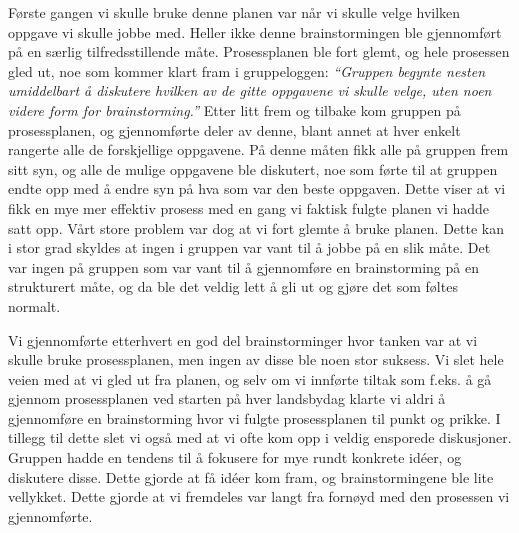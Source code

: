 Første gangen vi skulle bruke denne planen var når vi skulle velge hvilken oppgave vi skulle jobbe med. Heller ikke denne brainstormingen ble gjennomført på en særlig tilfredsstillende måte. Prosessplanen ble fort glemt, og hele prosessen gled ut, noe som kommer klart fram i gruppeloggen:
\newline
\emph{“Gruppen begynte nesten umiddelbart å diskutere hvilken av de gitte oppgavene vi skulle velge, uten noen videre form for brainstorming.”} 
\newline
Etter litt frem og tilbake kom gruppen på prosessplanen, og gjennomførte deler av denne, blant annet at hver enkelt rangerte alle de forskjellige oppgavene. På denne måten fikk alle på gruppen frem sitt syn, og alle de mulige oppgavene ble diskutert, noe som førte til at gruppen endte opp med å endre syn på hva som var den beste oppgaven. Dette viser at vi fikk en mye mer effektiv prosess med en gang vi faktisk fulgte planen vi hadde satt opp. Vårt store problem var dog at vi fort glemte å bruke planen. Dette kan i stor grad skyldes at ingen i gruppen var vant til å jobbe på en slik måte. Det var ingen på gruppen som var vant til å gjennomføre en brainstorming på en strukturert måte, og da ble det veldig lett å gli ut og gjøre det som føltes normalt.

Vi gjennomførte etterhvert en god del brainstorminger hvor tanken var at vi skulle bruke prosessplanen, men ingen av disse ble noen stor suksess. Vi slet hele veien med at vi gled ut fra planen, og selv om vi innførte tiltak som f.eks. å gå gjennom prosessplanen ved starten på hver landsbydag klarte vi aldri å gjennomføre en brainstorming hvor vi fulgte prosessplanen til punkt og prikke. I tillegg til dette slet vi også med at vi ofte kom opp i veldig ensporede diskusjoner. Gruppen hadde en tendens til å fokusere for mye rundt konkrete idéer, og diskutere disse. Dette gjorde at få idéer kom fram, og brainstormingene ble lite vellykket. Dette gjorde at vi fremdeles var langt fra fornøyd med den prosessen vi gjennomførte.

